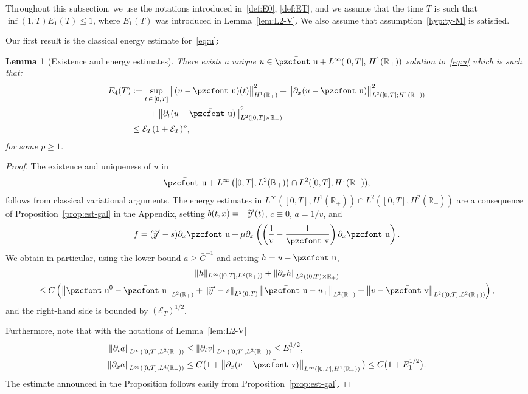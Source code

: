 \documentclass[10pt]{amsart}
\newtheorem{lemm}[theo]{Lemma}\newtheorem{prop}[theo]{Proposition}\newtheorem{coro}[theo]{Corollary}\newtheorem{conj}[theo]{Conjecture}
\theoremstyle{definition}\newtheorem{defi}[theo]{Definition}\newtheorem{rema}[theo]{Remark}\newtheorem{exam}[theo]{Example}\newtheorem{exem}[theo]{Example}\newtheorem{nota}[theo]{Notation}
\newcommand{\mathpzc}[1]{\text{\pzcfont #1}}
\newcommand{\R}{\mathbb{R}}
\newcommand{\p}{\partial}
\newcommand{\bv}{\bar{\mathpzc{v}}}
\newcommand{\bu}{\bar{\mathpzc{u}}}
\newcommand{\cE}{\mathcal E}
\newcommand{\tu}{\mathpzc{u}}
\newcommand{\ty}{\widetilde{y}}
\let\oldtilde\tilde
\renewcommand*{\tilde}[1]{\mathchoice{\widetilde{#1}}{\widetilde{#1}}{\oldtilde{#1}}{\oldtilde{#1}}}
\begin{document}
Throughout this subsection, we use the notations introduced in~\eqref{def:E0}, \eqref{def:ET}, and we assume that the time $T$ is such that $\inf(1,T) E_1(T) \leq 1$, where $E_1(T)$ was introduced in Lemma~\ref{lem:L2-V}. We also assume that assumption~\eqref{hyp:ty-M} is satisfied.


Our first result is the classical energy estimate for~\eqref{eq:u}:

\begin{lemm}[Existence and energy estimates]\label{lem:u-1}
There exists a unique $u \in \bu + L^\infty([0,T],\,H^1(\R_+))$ solution to~\eqref{eq:u} which is such that:
\begin{align}
E_4(T)&:= \sup_{t\,\in\,[0,T]}\left\|(u-\bu)(t)\right\|_{H^1(\R_+)}^2 + \left\|\partial_x (u-\bu)\right\|_{L^2\left([0,T];H^1(\R_+)\right)}^2\\
&\qquad+ \left\|\partial_t (u-\bu)\right\|_{L^2\left([0,T]\times\R_+\right)}^2 \nonumber \\
&\leq \cE_T(1+ \cE_T)^{p},
\end{align}
for some $p\geq 1$.
\end{lemm}

\begin{proof}
The existence and uniqueness of $u$ in
\[
\bu+L^\infty\left([0,T], L^2(\R_+)\right)\cap L^2([0,T], H^1(\R_+)),
\]
follows from classical variational arguments. The energy estimates in $L^\infty([0,T], H^1(\R_+))\cap L^2([0,T], H^2(\R_+))$ are a consequence of Proposition~\ref{prop:est-gal} in the Appendix, setting $b(t,x)=-\tilde y'(t)$, $c\equiv 0$, $a=1/v$, and
\[
f= (\ty'-s)\p_x \bu + \mu \p_x\left(\left(\frac{1}{v}-\frac{1}{\bv}\right) \p_x \bu\right).
\]
We obtain in particular, using the lower bound $a\geq \bar C^{-1}$ and setting $h=u-\bu$,
\begin{multline}\label{eq:energy-u}
\|h\|_{L^\infty\left([0,T], L^2(\R_+)\right)} + \left\| \p_xh\right\|_{L^2\left((0,T)\times\R_+\right) }\\
 \leq C\left(\left\|\tu^0-\bu\right\|_{L^2(\R_+)} + \left\|\ty'-s\right\|_{L^2(0,T)}\left\|\bu-u_+\right\|_{L^2(\R_+)} + \left\|v-\bv\right\|_{L^2\left([0,T], L^2(\R_+)\right)}\right),
\end{multline}
and the right-hand side is bounded by $(\cE_T)^{1/2}$.

Furthermore, note that with the notations of Lemma~\ref{lem:L2-V}
\begin{align*}
\left\|\p_t a\right\|_{L^\infty\left([0,T], L^2(\R_+)\right)}&\leq \left\|\p_t v\right\|_{L^\infty\left([0,T], L^2(\R_+)\right)}\leq E_1^{1/2},\\
\left\|\p_x a\right\|_{L^\infty\left([0,T], L^4(\R_+)\right)} &\leq C\big(1 + \left\|\p_x (v -\bv) \right\|_{L^\infty\left([0,T], H^1(\R_+)\right)}\big)\leq C\big(1+ E_1^{1/2}\big).
\end{align*}
The estimate announced in the Proposition follows easily from Proposition~\ref{prop:est-gal}.
\end{proof}
\end{document}
